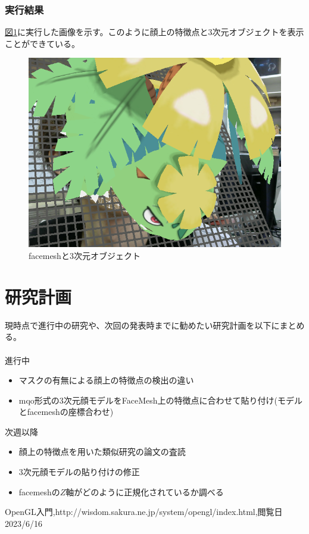 \documentclass[]{jarticle}          %
\begin{document}
\subsubsection{実行結果}
\hyperref[six]{図\ref{six}}に実行した画像を示す。このように顔上の特徴点と3次元オブジェクトを表示ことができている。
\begin{figure}[!ht]
  \begin{center}
    \includegraphics[scale=0.35]{figures/6.png}
    \caption{facemeshと3次元オブジェクト}
    \label{six}
  \end{center}
\end{figure}
\section{研究計画}
現時点で進行中の研究や、次回の発表時までに勧めたい研究計画を以下にまとめる。\\
\\
進行中
\begin{itemize}
  \item マスクの有無による顔上の特徴点の検出の違い
  \item mqo形式の3次元顔モデルをFaceMesh上の特徴点に合わせて貼り付け(モデルとfacemeshの座標合わせ)
\end{itemize}
次週以降
\begin{itemize}
  \item 顔上の特徴点を用いた類似研究の論文の査読
  \item 3次元顔モデルの貼り付けの修正
  \item facemeshの$Z$軸がどのように正規化されているか調べる
\end{itemize}

\begin{thebibliography}{99}
 OpenGL入門,http://wisdom.sakura.ne.jp/system/opengl/index.html,閲覧日2023/6/16
\end{thebibliography}
\end{document}

